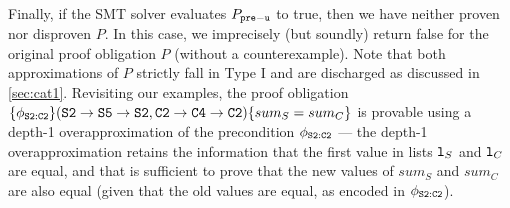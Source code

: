Finally, if the SMT solver evaluates
$P_{{\tt pre-u}}$ to true, then we have neither
proven nor disproven $P$. In this case, we
imprecisely (but soundly) return false for the
original proof obligation $P$ (without a counterexample).
Note that both approximations of $P$ strictly fall in Type I and are
discharged as discussed in \cref{sec:cat1}.
Revisiting our examples,
the proof obligation $\{\phi_{{\tt S2:C2}}\} ({\tt S2\rightarrow S5\rightarrow S2}, {\tt C2\rightarrow C4\rightarrow C2}) \\ \{sum_{S} = sum_{C}\}$ is provable using a depth-1 overapproximation of the
precondition $\phi_{{\tt S2:C2}}$ --- the depth-1 overapproximation retains the
information that the first value in lists ${\tt l}_S$
and ${\tt l}_C$ are equal, and that is sufficient to prove that
the new values of $sum_{S}$ and $sum_{C}$ are also equal (given that the
old values are equal, as encoded in $\phi_{{\tt S2:C2}}$).

